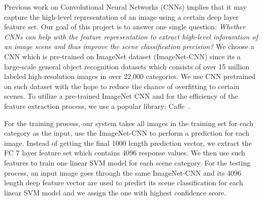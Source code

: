 
Previous work on Convolutional Neural Networks (CNNs) implies that it may capture the high-level representation of an image
using a certain deep layer feature set. Our goal of this project is to answer one single question: \emph{Whether CNNs can help with the feature representation
to extract high-level inforamtion of an image scene and thus improve the scene classification precision?} 
We choose a CNN which is pre-trained on ImageNet dataset (ImageNet-CNN) since its a large-scale general object recognition datasets which consists of over 15 million labeled
high-resolution images in over 22,000 categories. We use CNN pretrained on such dataset with the hope to reduce the chance of overfitting to certain scenes.
To utilize a pre-trained ImageNet CNN and for the efficiency of the feature extraction process, we use a popular library: Caffe~\cite{Jia:2014:CCA}.

For the training process, our system takes all images in the training set for each category as the input, use the ImageNet-CNN to perform a prediction for each image. Instead of
getting the final 1000 length prediction vector, we extract the FC 7 layer feature set which contains 4096 response values. We then use such features to train one linear SVM model
for each scene category. For the testing process, an input image goes through the same ImageNet-CNN and its 4096 length deep feature vector are used to predict its scene classification
for each linear SVM model and we assign the one with highest confidence score.



